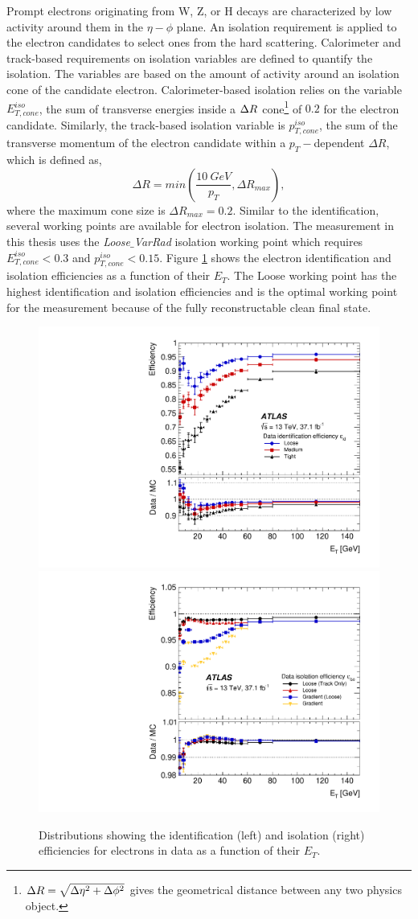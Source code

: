 Prompt electrons originating from W, Z, or H decays are characterized by low activity around them in the $\eta-\phi$ plane. An isolation requirement is applied to the electron candidates to select ones from the hard scattering. Calorimeter and track-based requirements on isolation variables are defined to quantify the isolation. The variables are based on the amount of activity around an isolation cone of the candidate electron. Calorimeter-based isolation relies on the variable $E_{T,cone}^{iso}$, the sum of transverse energies inside a $\Delta R$ cone\footnote{$\Delta R=\sqrt{\Delta\eta^2+\Delta\phi^2}$ gives the geometrical distance between any two physics object.} of $0.2$ for the electron candidate. Similarly, the track-based isolation variable is $p_{T,cone}^{iso}$, the sum of the transverse momentum of the electron candidate within a $p_{T}-$dependent $\Delta R$, which is defined as, 
\begin{equation}
\Delta R = min \left( \frac{10 ~ GeV}{p_{T}},\Delta R_{max} \right),
\end{equation}
where the maximum cone size is $\Delta R_{max} = 0.2$. Similar to the identification, several working points are available for electron isolation. The measurement in this thesis uses the \textit{Loose$\_$VarRad} isolation working point which requires $E_{T,cone}^{iso} < 0.3$ and $p_{T,cone}^{iso} < 0.15$. Figure \ref{fig:ElecEff} shows the electron identification and isolation efficiencies as a function of their $E_{T}$. The Loose working point has the highest identification and isolation efficiencies and is the optimal working point for the measurement because of the fully reconstructable clean final state.

\begin{figure}[!htbp]
    \centering
    \includegraphics[width=.49\linewidth]{figures/LHC/ElecIdent_Eff.pdf}
    \includegraphics[width=.49\linewidth]{figures/LHC/Elec_IsoEff.pdf}
    \caption{ Distributions showing the identification (left) and isolation (right) efficiencies for electrons in data as a function of their $E_{T}$\cite{ElectronReco}.\label{fig:ElecEff}}
\end{figure}


